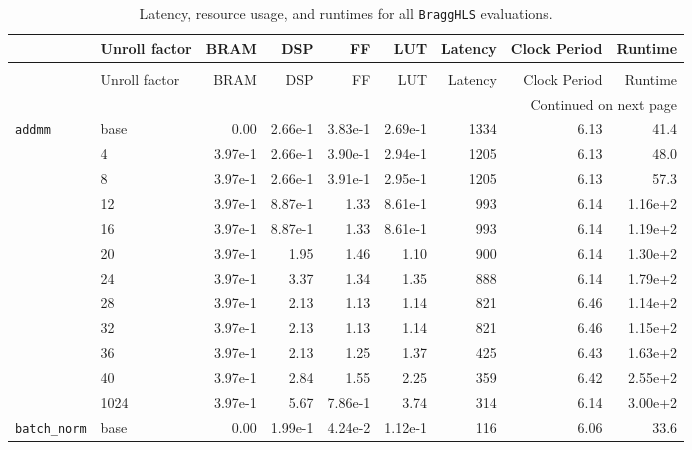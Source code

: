 \begin{longtable}{llrrrrrrr}
\caption{Latency, resource usage, and runtimes for all \texttt{BraggHLS} evaluations.}
\label{tab:all_unrolls}\\
\toprule
 & Unroll factor &       BRAM &      DSP &       FF &      LUT & Latency & Clock Period &  Runtime \\
\midrule
\endfirsthead
\caption[]{Latency, resource usage, and runtimes for all \texttt{BraggHLS} evaluations.} \\
\toprule
& Unroll factor &       BRAM &      DSP &       FF &      LUT & Latency & Clock Period &  Runtime \\
\midrule
\endhead
\midrule
\multicolumn{9}{r}{{Continued on next page}} \\
\midrule
\endfoot

\bottomrule
\endlastfoot
\texttt{addmm} & base &   0.00 & 2.66e-1 & 3.83e-1 & 2.69e-1 &    1334 &     6.13 & 41.4 \\
\cmidrule{2-9}
         & 4    &   3.97e-1 & 2.66e-1 & 3.90e-1 & 2.94e-1 &    1205 &     6.13 & 48.0 \\
\cmidrule{2-9}
         & 8    &   3.97e-1 & 2.66e-1 & 3.91e-1 & 2.95e-1 &    1205 &     6.13 & 57.3 \\
\cmidrule{2-9}
         & 12   &   3.97e-1 & 8.87e-1 & 1.33 & 8.61e-1 &     993 &     6.14 & 1.16e+2 \\
\cmidrule{2-9}
         & 16   &   3.97e-1 & 8.87e-1 & 1.33 & 8.61e-1 &     993 &     6.14 & 1.19e+2 \\
\cmidrule{2-9}
         & 20   &   3.97e-1 & 1.95 & 1.46 & 1.10 &     900 &     6.14 & 1.30e+2 \\
\cmidrule{2-9}
         & 24   &   3.97e-1 & 3.37 & 1.34 & 1.35 &     888 &     6.14 & 1.79e+2 \\
\cmidrule{2-9}
         & 28   &   3.97e-1 & 2.13 & 1.13 & 1.14 &     821 &     6.46 & 1.14e+2 \\
\cmidrule{2-9}
         & 32   &   3.97e-1 & 2.13 & 1.13 & 1.14 &     821 &     6.46 & 1.15e+2 \\
\cmidrule{2-9}
         & 36   &   3.97e-1 & 2.13 & 1.25 & 1.37 &     425 &     6.43 & 1.63e+2 \\
\cmidrule{2-9}
         & 40   &   3.97e-1 & 2.84 & 1.55 & 2.25 &     359 &     6.42 & 2.55e+2 \\
\cmidrule{2-9}
         & 1024 &   3.97e-1 & 5.67 & 7.86e-1 & 3.74 &     314 &     6.14 & 3.00e+2 \\
\midrule
\texttt{batch\_norm} & base &   0.00 & 1.99e-1 & 4.24e-2 & 1.12e-1 &     116 &     6.06 & 33.6 \\

\end{longtable}
